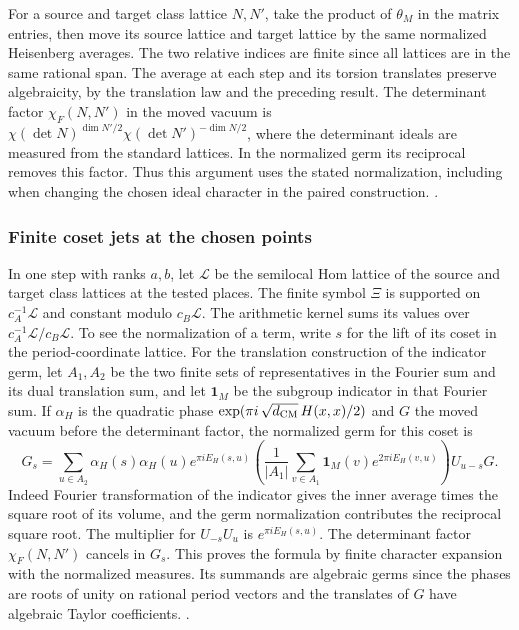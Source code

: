 For a source and target class lattice \(N,N'\), take the
product of \(\theta_M\) in the matrix entries, then move its
source lattice and target lattice by the same normalized
Heisenberg averages. The two relative indices are finite since
all lattices are in the same rational span. The average at each
step and its torsion translates preserve algebraicity, by the
translation law and the preceding result. The determinant
factor \(\chi_F(N,N')\) in the moved vacuum is
\(\chi(\det N)^{\dim N'/2}\chi(\det N')^{-\dim N/2}\),
where the determinant ideals are measured from the standard
lattices. In the normalized germ its reciprocal removes this
factor. Thus this argument uses the stated normalization,
including when changing the chosen ideal character in the
paired construction.
.

\subsubsection{Finite coset jets at the chosen points}
In one step with ranks \(a,b\), let \(\mathcal L\) be the
semilocal Hom lattice of the source and target class lattices
at the tested places. The finite symbol \(\Xi\) is supported
on \(c_A^{-1}\mathcal L\) and constant modulo \(c_B\mathcal L\).
The arithmetic kernel sums its values over
\(c_A^{-1}\mathcal L/c_B\mathcal L\). To see the normalization
of a term, write \(s\) for the lift of its coset in the
period-coordinate lattice. For the translation construction
of the indicator germ, let \(A_1,A_2\) be the two finite
sets of representatives in the Fourier sum and its dual
translation sum, and let \(\mathbf 1_M\) be the subgroup
indicator in that Fourier sum. If \(\alpha_H\) is the quadratic
phase \(\exp(\pi i\,\sqrt{d_{\rm CM}}\,H(x,x)/2)\) and \(G\)
the moved vacuum before the determinant factor, the normalized
germ for this coset is
\[
 G_s=\sum_{u\in A_2}
    \alpha_H(s)\alpha_H(u)e^{\pi i E_H(s,u)}
       \left(\frac1{|A_1|}
            \sum_{v\in A_1}\mathbf1_M(v)e^{2\pi iE_H(v,u)}\right)
     U_{u-s}G.
\]
Indeed Fourier transformation of the indicator gives the
inner average times the square root of its volume, and the
germ normalization contributes the reciprocal square root.
The multiplier for \(U_{-s}U_u\) is \(e^{\pi iE_H(s,u)}\).
The determinant factor \(\chi_F(N,N')\) cancels in \(G_s\).
This proves the formula by finite character expansion with the
normalized measures. Its summands are algebraic germs since the
phases are roots of unity on rational period vectors and the
translates of \(G\) have algebraic Taylor coefficients.
.

